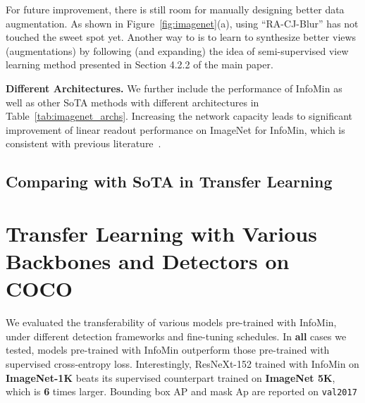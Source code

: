 \documentclass{article}
\begin{document}
For future improvement, there is still room for manually designing better data augmentation. As shown in Figure~\ref{fig:imagenet}(a), using ``RA-CJ-Blur'' has not touched the sweet spot yet. Another way to is to learn to synthesize better views (augmentations) by following (and expanding) the idea of semi-supervised view learning method presented in Section 4.2.2 of the main paper.

\noindent \textbf{Different Architectures.} We further include the performance of InfoMin as well as other SoTA methods with different architectures in Table~\ref{tab:imagenet_archs}. Increasing the network capacity leads to significant improvement of linear readout performance on ImageNet for InfoMin, which is consistent with previous literature~\cite{tian2019contrastive,he2019momentum,chen2020simple,misra2019self}.


\subsection{Comparing with SoTA in Transfer Learning}






 


\section{Transfer Learning with Various Backbones and Detectors on COCO}\label{sec:coco}
We evaluated the transferability of various models pre-trained with InfoMin, under different detection frameworks and fine-tuning schedules. In \textbf{all} cases we tested, models pre-trained with InfoMin outperform those pre-trained with supervised cross-entropy loss. Interestingly, ResNeXt-152 trained with InfoMin on \textbf{ImageNet-1K} beats its supervised counterpart trained on \textbf{ImageNet 5K}, which is \textbf{6} times larger. Bounding box AP and mask Ap are reported on \texttt{val2017}
\end{document}
